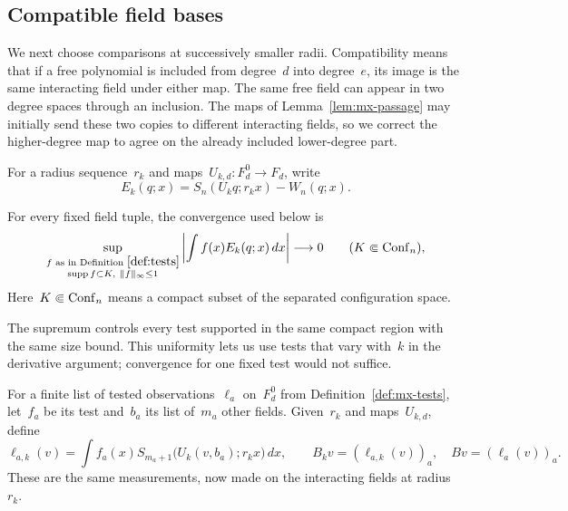\subsection{Compatible field bases}\label{subsec:mx-bases}

We next choose comparisons at successively smaller radii. Compatibility means that if a free polynomial is included from degree~$d$ into degree~$e$, its image is the same interacting field under either map.
The same free field can appear in two degree spaces through an inclusion. The maps of Lemma~\ref{lem:mx-passage} may initially send these two copies to different interacting fields, so we correct the higher-degree map to agree on the already included lower-degree part.


For a radius sequence~$r_k$ and maps~$U_{k,d}:F_d^0\to F_d$, write
\begin{equation}\label{eq:mx-difference}
 E_k(q;x)=S_n(U_kq;r_kx)-W_n(q;x).
\end{equation}
\begin{definition}\label{def:mx-tested-convergence}
For every fixed field tuple, the convergence used below is
\begin{equation}\label{eq:mx-weak}
 \sup_{\substack{f\text{ as in Definition }\ref{def:tests}\\
 \operatorname{supp} f\subset K,\ \|f\|_\infty\le1}}
 \left|\int f(x)E_k(q;x)\,dx\right|\longrightarrow0
 \qquad(K\Subset\operatorname{Conf}_{n}),
\end{equation}
Here~$K\Subset\operatorname{Conf}_{n}$ means a compact subset of the separated configuration space.
\end{definition}

The supremum controls every test supported in the same compact region with the same size bound. This uniformity lets us use tests that vary with~$k$ in the derivative argument; convergence for one fixed test would not suffice.

\begin{definition}\label{def:mx-moving-tests}
For a finite list of tested observations~$\ell_a$ on~$F_d^0$ from Definition~\ref{def:mx-tests}, let~$f_a$ be its test and~$b_a$ its list of~$m_a$ other fields.
Given~$r_k$ and maps~$U_{k,d}$, define
\begin{equation}\label{eq:mx-moving-tests}
 \ell_{a,k}(v)=\int f_a(x)S_{m_a+1}\bigl(U_k(v,b_a);r_kx\bigr)\,dx,
 \qquad B_kv=(\ell_{a,k}(v))_a,\quad Bv=(\ell_a(v))_a.
\end{equation}
These are the same measurements, now made on the interacting fields at radius~$r_k$.
\end{definition}

